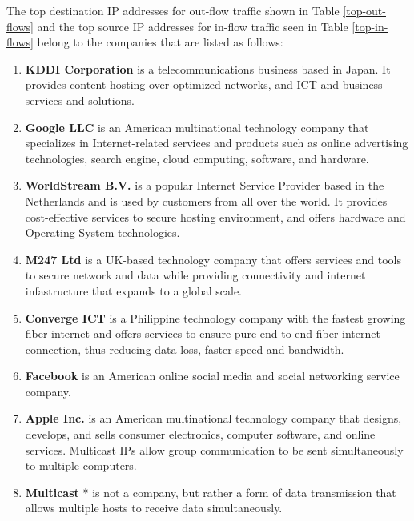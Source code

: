 \documentclass[journal]{IEEE/IEEEtran}
\begin{document}
The top destination IP addresses for out-flow traffic shown in Table \ref{top-out-flows} and the top source IP addresses for in-flow traffic seen in Table \ref{top-in-flows} belong to the companies that are listed as follows:

\begin{enumerate}
\item \textbf{KDDI Corporation} is a telecommunications business based in Japan. It provides content hosting over optimized networks, and ICT and business services and solutions.

\item \textbf{Google LLC} is an American multinational technology company that specializes in Internet-related services and products such as online advertising technologies, search engine, cloud computing, software, and hardware.

\item \textbf{WorldStream B.V.} is a popular Internet Service Provider based in the Netherlands and is used by customers from all over the world. It provides cost-effective services to secure hosting environment, and offers hardware and Operating System technologies.

\item \textbf{M247 Ltd} is a UK-based technology company that offers  services and tools to secure network and data while providing connectivity and internet infastructure that expands to a global scale.

\item \textbf{Converge ICT} is a Philippine technology company with the fastest growing fiber internet and offers services to ensure pure end-to-end fiber internet connection, thus reducing data loss, faster speed and bandwidth.

\item \textbf{Facebook} is an American online social media and social networking service company.

\item \textbf{Apple Inc.} is an American multinational technology company that designs, develops, and sells consumer electronics, computer software, and online services. Multicast IPs allow group communication to be sent simultaneously to multiple computers.

\item \textbf{Multicast} * is not a company, but rather a form of data transmission that allows multiple hosts to receive data simultaneously.

\end{enumerate}
\end{document}
